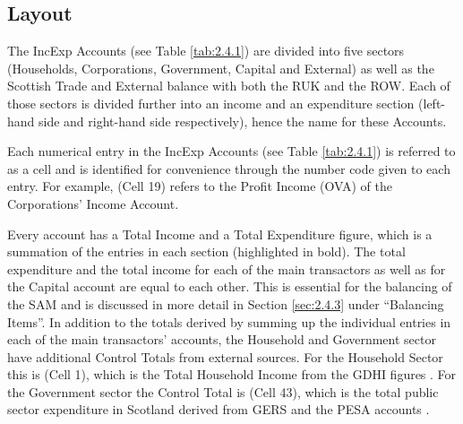 \newpage

\subsection{Layout}
\label{sec:2.4.2}

\bigskip

The IncExp Accounts (see Table \ref{tab:2.4.1}) are divided into five sectors (Households, Corporations, Government, Capital and External) as well as the Scottish Trade and External balance with both the RUK and the ROW. Each of those sectors is divided further into an income and an expenditure section (left-hand side and right-hand side respectively), hence the name for these Accounts.

\bigskip

Each numerical entry in the IncExp Accounts (see Table \ref{tab:2.4.1}) is referred to as a cell and is identified for convenience through the number code given to each entry. For example, (Cell 19) refers to the Profit Income (OVA) of the Corporations' Income Account.

\bigskip

Every account has a Total Income and a Total Expenditure figure, which is a summation of the entries in each section (highlighted in bold). The total expenditure and the total income for each of the main transactors as well as for the Capital account are equal to each other. This is essential for the balancing of the SAM and is discussed in more detail in Section \ref{sec:2.4.3} under ``Balancing Items''. In addition to the totals derived by summing up the individual entries in each of the main transactors' accounts, the Household and Government sector have additional Control Totals from external sources. For the Household Sector this is (Cell 1), which is the Total Household Income from the GDHI figures \cite{ONS2011b}. For the Government sector the Control Total is (Cell 43), which is the total public sector expenditure in Scotland derived from GERS and the PESA accounts \cite{ScotGov2013b, HMTR2012}.

\bigskip

